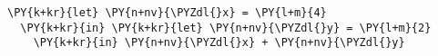 \begin{Verbatim}[commandchars=\\\{\}]
\PY{k+kr}{let} \PY{n+nv}{\PYZdl{}x} = \PY{l+m}{4}
  \PY{k+kr}{in} \PY{k+kr}{let} \PY{n+nv}{\PYZdl{}y} = \PY{l+m}{2}
    \PY{k+kr}{in} \PY{n+nv}{\PYZdl{}x} + \PY{n+nv}{\PYZdl{}y}
\end{Verbatim}
